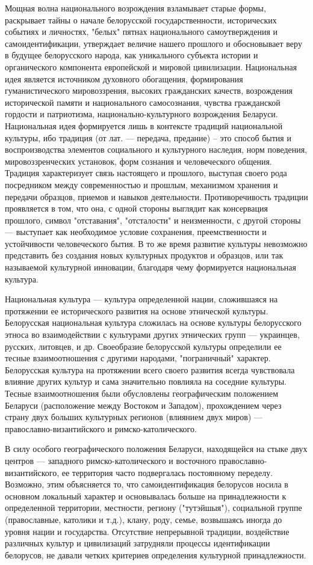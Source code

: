 Мощная волна национального возрождения взламывает старые формы, раскрывает тайны о начале белорусской государственности, исторических событиях и личностях, "белых" пятнах национального самоутверждения и самоидентификации, утверждает величие нашего прошлого и обосновывает веру в будущее белорусского народа, как уникального субъекта истории и органического компонента европейской и мировой цивилизации. Национальная идея является источником духовного обогащения, формирования гуманистического мировоззрения, высоких гражданских качеств, возрождения исторической памяти и национального самосознания, чувства гражданской гордости и патриотизма, национально-культурного возрождения Беларуси.
Национальная идея формируется лишь в контексте традиций национальной культуры, ибо традиция (от лат. — передача, предание) – это способ бытия и воспроизводства элементов социального и культурного наследия, норм поведения, мировоззренческих установок, форм сознания и человеческого общения. Традиция характеризует связь настоящего и прошлого, выступая своего рода посредником между современностью и прошлым, механизмом хранения и передачи образцов, приемов и навыков деятельности. Противоречивость традиции проявляется в том, что она, с одной стороны выглядит как консервация прошлого, символ "отставания", "отсталости" и неизменности, с другой стороны — выступает как необходимое условие сохранения, преемственности и устойчивости человеческого бытия. В то же время развитие культуры невозможно представить без создания новых культурных продуктов и образцов, или так называемой культурной инновации, благодаря чему формируется национальная культура.

Национальная культура — культура определенной нации, сложившаяся на протяжении ее исторического развития на основе этнической культуры. Белорусская национальная культура сложилась на основе культуры белорусского этноса во взаимодействии с культурами других этнических групп — украинцев, русских, литовцев, и др. Своеобразие белорусской культуры определили ее тесные взаимоотношения с другими народами, "пограничный" характер. Белорусская культура на протяжении всего своего развития всегда чувствовала влияние других культур и сама значительно повлияла на соседние культуры. Тесные взаимоотношения были обусловлены географическим положением Беларуси (расположение между Востоком и Западом), прохождением через страну двух больших культурных регионов (влиянием двух миров) — православно-византийского и римско-католического.

В силу особого географического положения Беларуси, находящейся на стыке двух центров — западного римско-католического и восточного православно-византийского, ее территория часто подвергалась постоянному переделу. Возможно, этим объясняется то, что самоидентификация белорусов носила в основном локальный характер и основывалась больше на принадлежности к определенной территории, местности, региону ("тутэйшыя"), социальной группе (православные, католики и т.д.), клану, роду, семье, возвышаясь иногда до уровня нации и государства. Отсутствие непрерывной традиции, воздействие различных культур и цивилизаций затрудняли процессы идентификации белорусов, не давали четких критериев определения культурной принадлежности.

